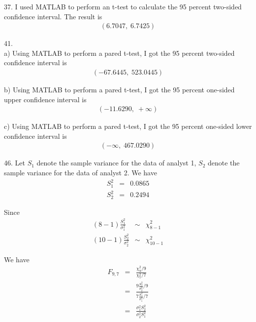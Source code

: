 \documentclass[12pt]{article}
\begin{document}
37. I used MATLAB to perform an t-test to calculate the 95 percent two-sided confidence interval. The result is
\begin{eqnarray*}
  \left(6.7047, \; 6.7425 \right)
\end{eqnarray*}

41. \\
a) Using MATLAB to perform a pared t-test, I got the 95 percent two-sided confidence interval is
\begin{eqnarray*}
  \left( -67.6445, \;  523.0445 \right)
\end{eqnarray*}

b) Using MATLAB to perform a pared t-test, I got the 95 percent one-sided upper confidence interval is
\begin{eqnarray*}
  \left( -11.6290, \; + \infty \right)
\end{eqnarray*}

c) Using MATLAB to perform a pared t-test, I got the 95 percent one-sided lower confidence interval is
\begin{eqnarray*}
  \left( - \infty, \; 467.0290 \right)
\end{eqnarray*}

46. Let $S_1$ denote the sample variance for the data of analyst 1, $S_2$ denote the sample variance for the data of analyst 2. We have
\begin{eqnarray*}
  S_1^2 &=& 0.0865 \\
  S_2^2 &=& 0.2494
\end{eqnarray*}

Since
\begin{eqnarray*}
  (8-1) \frac {S_1^2}{\sigma_1^2} &\sim& \chi_{8-1}^2 \\
  (10-1) \frac {S_2^2}{\sigma_2^2} &\sim& \chi_{10-1}^2
\end{eqnarray*}

We have
\begin{eqnarray*}
  F_{9, 7}
  &=& \frac {\chi_{9}^2 / 9} {\chi_{7}^2 / 7} \\
  &=& \frac {9 \frac {S_2^2}{\sigma_2^2} / 9}
  {7 \frac {S_1^2}{\sigma_1^2} / 7} \\
  &=& \frac {\sigma_1^2 S_2^2}{\sigma_2^2 S_1^2}
\end{eqnarray*}
\end{document}
